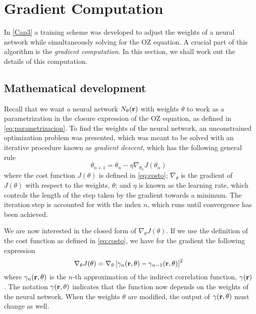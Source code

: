 \chapter{Gradient Computation}
\label{AppendixA}

In \autoref{Cap3} a training scheme was developed to adjust the weights of a neural
network while simultaneously solving for the OZ equation. A crucial part of
this algorithm is the \emph{gradient computation}. In this section, we shall work
out the details of this computation.

\section{Mathematical development}
Recall that we want a neural network $N_{\theta}(\mathbf{r})$ with weights $\theta$ to work as a
parametrization in the closure expression of the OZ equation, as defined in
\autoref{eq:parametrizacion}. To find the weights of the neural network, an
unconstrained optimization problem was presented, which was meant to be solved with
an iterative procedure known as \emph{gradient descent}, which has the following
general rule
\[
\theta_{n+1} = \theta_{n} - \eta \nabla_{\theta_{n}} J(\theta_{n})
\]
where the cost function $J(\theta)$ is defined in \autoref{eq:costo}; $\nabla_{\theta}$
is the gradient of $J(\theta)$ with respect to the weights, $\theta$; and $\eta$ is known
as the learning rate, which controls the length of the step taken by the gradient
towards a minimum. The iteration step is accounted for with the index $n$, which runs until
convergence has been achieved.

We are now interested in the closed form of $\nabla_{\theta} J(\theta)$. If we use the
definition of the cost function as defined in \autoref{eq:costo}, we have for the
gradient the following expression
\begin{equation}
    \nabla_{\theta} J(\theta) = \nabla_{\theta} \left[\gamma_{n}(\mathbf{r}, \theta) - \gamma_{n-1}(\mathbf{r}, \theta) \right]^2
    \label{eq:grad1}
\end{equation}
where $\gamma_{n}(\mathbf{r}, \theta)$ is the $n$-th approximation of the indirect
correlation function, $\gamma(\mathbf{r})$.
The notation $\gamma(\mathbf{r}, \theta)$ indicates that the function now depends
on the weights of the neural network. When the weights $\theta$ are modified, the output of
$\gamma(\mathbf{r}, \theta)$ must change as well.

